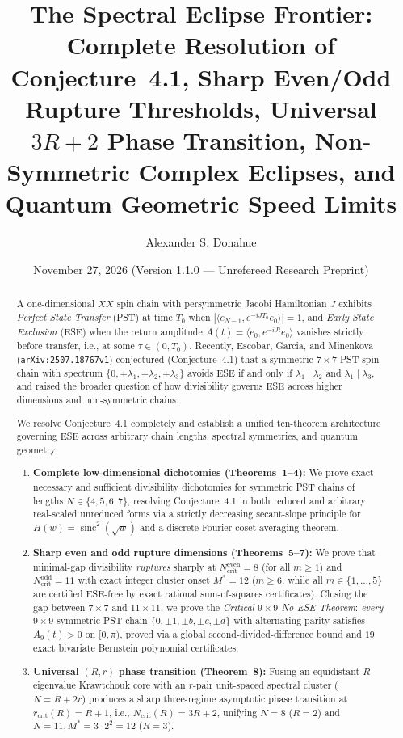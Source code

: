 \documentclass[11pt,reqno]{amsart}
\title[The Spectral Eclipse Frontier]{The Spectral Eclipse Frontier: Complete Resolution of Conjecture~4.1, Sharp Even/Odd Rupture Thresholds, Universal $3R+2$ Phase Transition, Non-Symmetric Complex Eclipses, and Quantum Geometric Speed Limits}
\author{Alexander S. Donahue}
\date{November 27, 2026 (Version 1.1.0 --- Unrefereed Research Preprint)}
\theoremstyle{definition}
\newcommand{\sinc}{\operatorname{sinc}}
\begin{document}
\begin{abstract}
A one-dimensional $XX$ spin chain with persymmetric Jacobi Hamiltonian $J$ exhibits \emph{Perfect State Transfer} (PST) at time $T_0$ when $|\langle e_{N-1}, e^{-i J T_0} e_0\rangle|=1$, and \emph{Early State Exclusion} (ESE) when the return amplitude $A(t)=\langle e_0, e^{-i J t} e_0\rangle$ vanishes strictly before transfer, i.e., at some $\tau\in(0,T_0)$. Recently, Escobar, Garcia, and Minenkova (\texttt{arXiv:2507.18767v1}) conjectured (Conjecture~4.1) that a symmetric $7\times 7$ PST spin chain with spectrum $\{0,\pm\lambda_1,\pm\lambda_2,\pm\lambda_3\}$ avoids ESE if and only if $\lambda_1\mid\lambda_2$ and $\lambda_1\mid\lambda_3$, and raised the broader question of how divisibility governs ESE across higher dimensions and non-symmetric chains.

We resolve Conjecture~4.1 completely and establish a unified ten-theorem architecture governing ESE across arbitrary chain lengths, spectral symmetries, and quantum geometry:
\begin{enumerate}
\item \textbf{Complete low-dimensional dichotomies (Theorems~1--4):} We prove exact necessary and sufficient divisibility dichotomies for symmetric PST chains of lengths $N\in\{4,5,6,7\}$, resolving Conjecture~4.1 in both reduced and arbitrary real-scaled unreduced forms via a strictly decreasing secant-slope principle for $H(w)=\sinc^2(\sqrt{w})$ and a discrete Fourier coset-averaging theorem.
\item \textbf{Sharp even and odd rupture dimensions (Theorems~5--7):} We prove that minimal-gap divisibility \emph{ruptures} sharply at $N_{\mathrm{crit}}^{\mathrm{even}}=8$ (for all $m\ge 1$) and $N_{\mathrm{crit}}^{\mathrm{odd}}=11$ with exact integer cluster onset $M^*=12$ ($m\ge 6$, while all $m\in\{1,\dots,5\}$ are certified ESE-free by exact rational sum-of-squares certificates). Closing the gap between $7\times 7$ and $11\times 11$, we prove the \emph{Critical $9\times 9$ No-ESE Theorem}: \emph{every} $9\times 9$ symmetric PST chain $\{0,\pm 1,\pm b,\pm c,\pm d\}$ with alternating parity satisfies $A_9(t)>0$ on $[0,\pi)$, proved via a global second-divided-difference bound and $19$ exact bivariate Bernstein polynomial certificates.
\item \textbf{Universal $(R,r)$ phase transition (Theorem~8):} Fusing an equidistant $R$-eigenvalue Krawtchouk core with an $r$-pair unit-spaced spectral cluster ($N=R+2r$) produces a sharp three-regime asymptotic phase transition at $r_{\mathrm{crit}}(R)=R+1$, i.e., $N_{\mathrm{crit}}(R)=3R+2$, unifying $N=8$ ($R=2$) and $N=11, M^*=3\cdot 2^2=12$ ($R=3$).

\end{enumerate}
\end{abstract}
\end{document}
